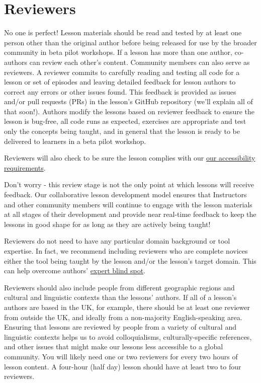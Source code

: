 \documentclass[]{book}
\begin{document}
\hypertarget{reviewers}{%
\section{Reviewers}\label{reviewers}}

No one is perfect! Lesson materials should be read and tested by at least
one person other than the original author before being released for use by the broader community in beta pilot workshops.
If a lesson has more than one author, co-authors can review each other's content.
Community members can also serve as reviewers. A reviewer commits to carefully
reading and testing all code for a lesson or set of episodes and leaving detailed
feedback for lesson authors to correct any errors or other issues found. This feedback is
provided as issues and/or pull requests (PRs) in the lesson's GitHub repository
(we'll explain all of that soon!). Authors modify the lessons based on reviewer feedback to ensure the
lesson is bug-free, all code runs as expected, exercises are appropriate and test
only the concepts being taught, and in general that the lesson is ready to be
delivered to learners in a beta pilot workshop.

Reviewers will also check to be sure the lesson complies with our
\href{link}{our accessibility requirements}.

Don't worry - this review stage is not the only point at which lessons will
receive feedback. Our collaborative lesson development model ensures that
Instructors and other community members will continue to engage with the lesson
materials at all stages of their development and provide near real-time feedback
to keep the lessons in good shape for as long as they are actively being taught!

Reviewers do not need to have any particular domain background or tool expertise.
In fact, we recommend including reviewers who are complete novices either
the tool being taught by the lesson and/or the lesson's target domain. This can
help overcome authors' \href{https://carpentries.github.io/instructor-training/03-expertise/}{expert blind spot}.

Reviewers should also include people from different geographic regions and
cultural and linguistic contexts than the lessons' authors. If all of
a lesson's authors are based in the UK, for example, there should be at least
one reviewer from outside the UK, and ideally from a non-majority English-speaking
area. Ensuring that lessons are reviewed by people from a variety of cultural and linguistic
contexts helps us to avoid colloquialisms, culturally-specific references, and other issues that might make our lessons less accessible to a global community. You will likely need one or two reviewers for every
two hours of lesson content. A four-hour (half day) lesson should have at least two to four reviewers.
\end{document}
